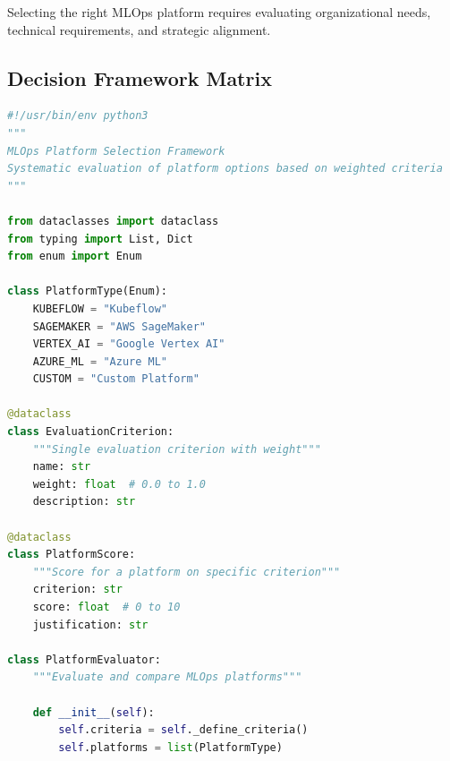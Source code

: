 Selecting the right MLOps platform requires evaluating organizational needs, technical requirements, and strategic alignment.

\subsection{Decision Framework Matrix}

\begin{lstlisting}[language=Python, caption=Platform Selection Decision Framework]
#!/usr/bin/env python3
"""
MLOps Platform Selection Framework
Systematic evaluation of platform options based on weighted criteria
"""

from dataclasses import dataclass
from typing import List, Dict
from enum import Enum

class PlatformType(Enum):
    KUBEFLOW = "Kubeflow"
    SAGEMAKER = "AWS SageMaker"
    VERTEX_AI = "Google Vertex AI"
    AZURE_ML = "Azure ML"
    CUSTOM = "Custom Platform"

@dataclass
class EvaluationCriterion:
    """Single evaluation criterion with weight"""
    name: str
    weight: float  # 0.0 to 1.0
    description: str

@dataclass
class PlatformScore:
    """Score for a platform on specific criterion"""
    criterion: str
    score: float  # 0 to 10
    justification: str

class PlatformEvaluator:
    """Evaluate and compare MLOps platforms"""

    def __init__(self):
        self.criteria = self._define_criteria()
        self.platforms = list(PlatformType)


\end{lstlisting}
